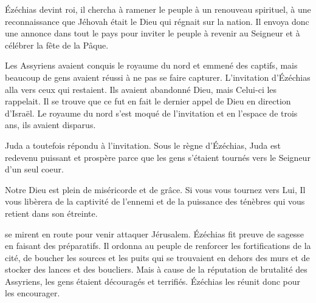  Ézéchias devint roi, il chercha à ramener le peuple
 à un renouveau spirituel, à une reconnaissance que Jéhovah était le Dieu
 qui régnait sur la nation.
 Il envoya donc une annonce dans tout le pays pour inviter le peuple
 à revenir au Seigneur et à célébrer la fête de la Pâque.

Les Assyriens avaient conquis le royaume du nord et emmené des captifs,
 mais beaucoup de gens avaient réussi à ne pas se faire capturer.
 L'invitation d'Ézéchias alla vers ceux qui restaient.
 Ils avaient abandonné Dieu, mais Celui-ci les rappelait.
 Il se trouve que ce fut en fait le dernier appel de Dieu en direction d'Israël.
 Le royaume du nord s'est moqué de l'invitation et en l'espace de trois ans,
 ils avaient disparus. 


Juda a toutefois répondu à l'invitation. Sous le règne d'Ézéchias,
 Juda est redevenu puissant et prospère parce que les gens s'étaient
 tournés vers le Seigneur d'un seul coeur.

Notre Dieu est plein de miséricorde et de grâce.
 Si vous vous tournez vers Lui, Il vous libèrera de la captivité
 de l'ennemi et de la puissance des ténèbres qui vous retient
 dans son étreinte. 

\dvrule








 se mirent en route pour venir attaquer Jérusalem.
 Ézéchias fit preuve de sagesse en faisant des préparatifs.
 Il ordonna au peuple de renforcer les fortifications de la cité,
 de boucher les sources et les puits qui se trouvaient en dehors des murs
 et de stocker des lances et des boucliers.
 Mais à cause de la réputation de brutalité des Assyriens,
 les gens étaient découragés et terrifiés.
 Ézéchias les réunit donc pour les encourager.

